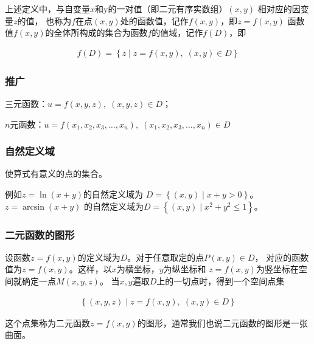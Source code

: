 \documentclass[12pt, a4paper]{article}
\numberwithin{equation}{section}
\begin{document}
    上述定义中，与自变量\(x\)和y\(\)的一对值（即二元有序实数组）\(\left(x,y\right)\) 相对应的因变量\(z\)的值，
    也称为\(f\)在点\(\left(x,y\right)\)处的函数值，记作\(f\left(x,y\right)\)，即\(z=f\left(x,y\right)\)
    函数值\(f\left(x,y\right)\)的全体所构成的集合为函数\(f\)的值域，记作\(f\left(D\right)\)，即

    \begin{align}
        f\left(D\right) = \left\{z \mid z=f\left(x,y\right),\; \left(x,y\right) \in D\right\}
    \end{align}

    \subsubsection{推广}

    三元函数：\(u = f\left(x,y,z\right),\; \left(x,y,z\right) \in D\)；

    \(n\)元函数：\(u = f\left(x_1,x_2,x_3,\ldots,x_n\right),\; \left(x_1,x_2,x_3,\ldots,x_n\right) \in D\)

    \subsubsection{自然定义域}

    使算式有意义的点的集合。
    
    例如\(z = \ln \left(x+y\right)\)的自然定义域为
    \(D = \left\{\left(x,y\right) \mid x + y > 0\right\}\)。\(z = \arcsin \left(x+y\right)\)
    的自然定义域为\(D = \left\{\left(x,y\right) \mid x^2 + y^2 \leq 1\right\}\)。

    \subsubsection{二元函数的图形}

    设函数\(z=f\left(x,y\right)\)的定义域为\(D\)。对于任意取定的点\(P(x,y) \in D\)，
    对应的函数值为\(z=f\left(x,y\right)\)。这样，以\(x\)为横坐标，\(y\)为纵坐标和
    \(z=f\left(x,y\right)\)为竖坐标在空间就确定一点\(M\left(x,y,z\right)\)。
    当\(x,y\)遍取\(D\)上的一切点时，得到一个空间点集

    \begin{align}
        \left\{\left(x,y,z\right) \mid z=f\left(x,y\right),\; \left(x,y\right) \in D\right\}
    \end{align}
    
    这个点集称为二元函数\(z=f\left(x,y\right)\)的图形，通常我们也说二元函数的图形是一张曲面。
\end{document}
